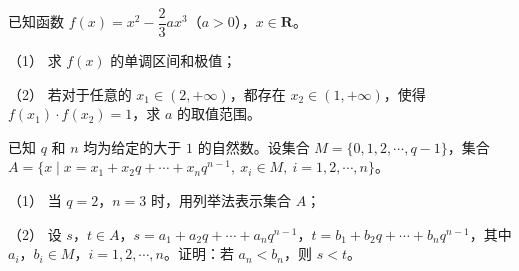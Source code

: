 \begin{question}
已知函数 $f(x)=x^2-\dfrac23ax^3$（$a>0$），$x\in\mathbf R$。

（1） 求 $f(x)$ 的单调区间和极值；

（2） 若对于任意的 $x_1\in(2,+\infty)$，都存在 $x_2\in(1,+\infty)$，使得 $f(x_1)\cdot f(x_2)=1$，求 $a$ 的取值范围。

\end{question}
\begin{question}
已知 $q$ 和 $n$ 均为给定的大于 $1$ 的自然数。设集合 $M=\{0,1,2,\cdots,q-1\}$，集合 $A=\{x\mid x=x_1+x_2q+\cdots+x_nq^{n-1},\ x_i\in M,\ i=1,2,\cdots,n\}$。

（1） 当 $q=2$，$n=3$ 时，用列举法表示集合 $A$；

（2） 设 $s$，$t\in A$，$s=a_1+a_2q+\cdots+a_nq^{n-1}$，$t=b_1+b_2q+\cdots+b_nq^{n-1}$，其中 $a_i$，$b_i\in M$，$i=1,2,\cdots,n$。证明：若 $a_n<b_n$，则 $s<t$。

\end{question}